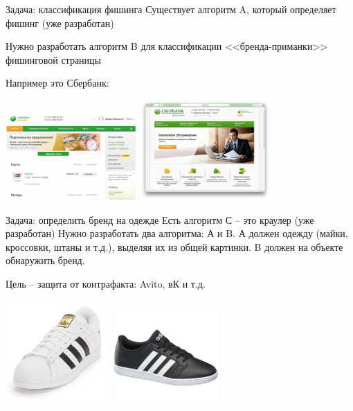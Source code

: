 \begin{frame}{Задача: классификация фишинга}
	\small
	Существует алгоритм A, который определяет фишинг (уже разработан)
	
	Нужно разработать алгоритм B для классификации <<бренда-приманки>> фишинговой страницы
	
	Например это Сбербанк:
	
	\includegraphics[width=5cm]{../pic/sber1.png}
	\includegraphics[width=5cm]{../pic/sber2.png}
	
\end{frame}

\begin{frame}{Задача: определить бренд на одежде}
	\small
	Есть алгоритм С -- это краулер (уже разработан)
	Нужно разработать два алгоритма: А и B.
	А должен одежду (майки, кроссовки, штаны и т.д.),
	выделяя их из общей картинки. B должен на объекте обнаружить бренд.
	
	Цель -- защита от контрафакта: Avito, вК и т.д.
	
	\includegraphics[width=4cm]{../pic/adidas1.png}
	\includegraphics[width=4cm]{../pic/adidas2.png}
	
	
\end{frame}

